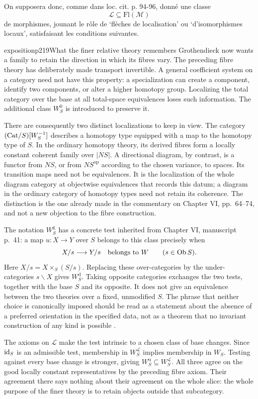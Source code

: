On supposera donc, comme dans loc. cit. p. 94-96, donné une classe
\[
\mathcal{L} \subseteq \mathrm{Fl}(\mathcal{M})
\]
de morphismes, jounant le rôle de `flèches de %
localisation' ou `d'isomorphismes locaux', satisfaisant les conditions suivantes.

\begin{dcomment}{exposition}{p219}{What the finer relative theory remembers}
Grothendieck now wants a family to retain the direction in which its fibres vary. The preceding fibre theory has deliberately made transport invertible. A general coefficient system on a category need not have this property: a specialization can create a component, identify two components, or alter a higher homotopy group. Localizing the total category over the base at all total-space equivalences loses such information. The additional class $W^0_S$ is introduced to preserve it.

There are consequently two distinct localizations to keep in view. The category $(\mathrm{Cat}/S)[W_S^{-1}]$ describes a homotopy type equipped with a map to the homotopy type of $S$. In the ordinary homotopy theory, its derived fibres form a locally constant coherent family over $|NS|$. A directional diagram, by contrast, is a functor from $NS$, or from $NS^{\mathrm{op}}$ according to the chosen variance, to spaces. Its transition maps need not be equivalences. It is the localization of the whole diagram category at objectwise equivalences that records this datum; a diagram in the ordinary category of homotopy types need not retain its coherence. The distinction is the one already made in the commentary on Chapter VI, pp.~64--74, and not a new objection to the fibre construction.

The notation $W^{\mathrm g}_S$ has a concrete test inherited from Chapter VI, manuscript p.~41: a map $u:X\to Y$ over $S$ belongs to this class precisely when
\[
 X/s\longrightarrow Y/s\quad\hbox{belongs to }W
 \qquad(s\in\mathrm{Ob}\, S).
\]
Here $X/s=X\times_S(S/s)$. Replacing these over-categories by the under-categories $s\backslash X$ gives $W^{\mathrm d}_S$. Taking opposite categories exchanges the two tests, together with the base $S$ and its opposite. It does not give an equivalence between the two theories over a fixed, unmodified $S$. The phrase that neither choice is canonically imposed should be read as a statement about the absence of a preferred orientation in the specified data, not as a theorem that no invariant construction of any kind is possible \citep[Chapter VI, manuscript pp.~41--42]{Grothendieck1990VI}.

The axioms on $\mathcal L$ make the test intrinsic to a chosen class of base changes. Since $\mathrm{id}_S$ is an admissible test, membership in $W^{\mathcal L}_S$ implies membership in $W_S$. Testing against every base change is stronger, giving $W^{\mathrm u}_S\subseteq W^{\mathcal L}_S$. All three agree on the good locally constant representatives by the preceding fibre axiom. Their agreement there says nothing about their agreement on the whole slice: the whole purpose of the finer theory is to retain objects outside that subcategory.
\end{dcomment}



